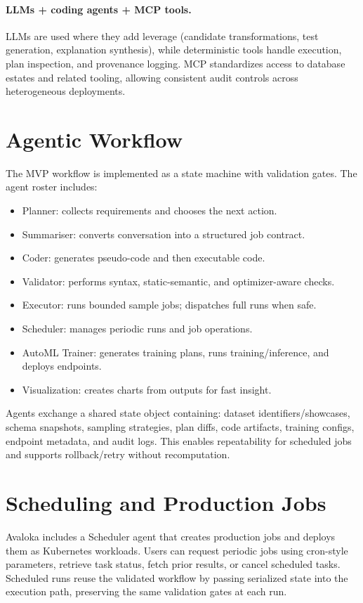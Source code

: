 \documentclass{article} %
\begin{document}
\paragraph{LLMs + coding agents + MCP tools.}
LLMs are used where they add leverage (candidate transformations, test generation, explanation synthesis),
while deterministic tools handle execution, plan inspection, and provenance logging. MCP standardizes access
to database estates and related tooling, allowing consistent audit controls across heterogeneous deployments.

\section{Agentic Workflow}
\label{sec:workflow}
The MVP workflow is implemented as a state machine with validation gates. The agent roster includes:
\begin{itemize}
  \item Planner: collects requirements and chooses the next action.
  \item Summariser: converts conversation into a structured job contract.
  \item Coder: generates pseudo-code and then executable code.
  \item Validator: performs syntax, static-semantic, and optimizer-aware checks.
  \item Executor: runs bounded sample jobs; dispatches full runs when safe.
  \item Scheduler: manages periodic runs and job operations.
  \item AutoML Trainer: generates training plans, runs training/inference, and deploys endpoints.
  \item Visualization: creates charts from outputs for fast insight.
\end{itemize}

Agents exchange a shared state object containing: dataset identifiers/showcases, schema snapshots, sampling
strategies, plan diffs, code artifacts, training configs, endpoint metadata, and audit logs. This enables
repeatability for scheduled jobs and supports rollback/retry without recomputation.

\section{Scheduling and Production Jobs}
\label{sec:scheduling}
Avaloka includes a Scheduler agent that creates production jobs and deploys them as Kubernetes workloads.
Users can request periodic jobs using cron-style parameters, retrieve task status, fetch prior results, or
cancel scheduled tasks. Scheduled runs reuse the validated workflow by passing serialized state into the
execution path, preserving the same validation gates at each run.
\end{document}

